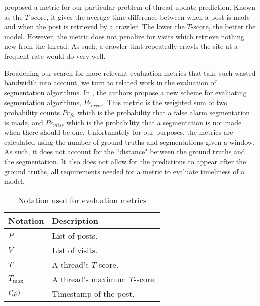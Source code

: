 
\renewcommand{\P}{Pr}
 
 proposed a metric for our particular problem of thread update prediction. Known as the $T$-score, it gives the average 
time difference between when a post is made and when the post is retrieved by a crawler. The lower the $T$-score, the 
better the model. However, the metric does not penalize for visits which retrieve 
nothing new from the thread.  As such, a crawler that repeatedly crawls the site 
at a frequent rate would do very well.

Broadening our search for more relevant evaluation metrics that take such
wasted bandwidth into account, we turn to related work in the evaluation of
segmentation algorithms.  In , the authors propose a
new scheme for evaluating segmentation algorithms, $Pr_{error}$. 
This metric is the weighted sum of two 
probability counts $Pr_{fa}$ which is the probability that a false alarm 
segmentation is made, and $Pr_{miss}$ which is the probability that a 
segmentation is not made when there should be one. Unfortunately for our 
purposes, the metrics are calculated using the number of ground truths and 
segmentations given a window. As such, it does not account for the ``distance" 
between the ground truths and the segmentation. It also does not allow for the 
predictions to appear after the ground truths, all requirements needed for a 
metric to evaluate timeliness of a model.


%
\begin{table}
\begin{center}
\begin{tabular}{l l}
	\hline
Notation	&	Description		\\
	\hline
$P$			&	List of posts. \\
$V$			&	List of visits.\\
$T$			&	A thread's $T$-score. \\
	$T_\text{max}$	&	A thread's maximum $T$-score. \\
$t(\rho)$	&	Timestamp of the post.\\
	\hline
\end{tabular}
\end{center}
	\caption{Notation used for evaluation metrics}
\end{table}


